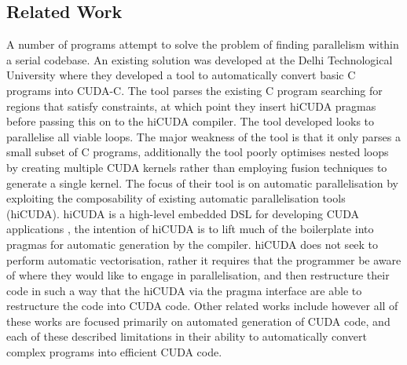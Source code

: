 \subsection{Related Work}
A number of programs attempt to solve the problem of finding parallelism within a serial codebase.
An existing solution was developed at the Delhi Technological University\cite{jindal2012automated}
where they developed a tool to automatically convert basic C programs into CUDA-C. The tool parses
the existing C program searching for regions that satisfy constraints, at which point they insert
hiCUDA pragmas before passing this on to the hiCUDA compiler. The tool developed looks to
parallelise all viable loops. The major weakness of the tool is that it only parses a small subset
of C programs, additionally the tool poorly optimises nested loops by creating multiple CUDA kernels
rather than employing fusion techniques to generate a single kernel. The focus of their tool is on
automatic parallelisation by exploiting the composability of existing automatic parallelisation
tools (hiCUDA). hiCUDA is a high-level embedded DSL for developing CUDA applications
\cite{han2011hicuda}, the intention of hiCUDA is to lift much of the boilerplate into pragmas for
automatic generation by the compiler. hiCUDA does not seek to perform automatic vectorisation,
rather it requires that the programmer be aware of where they would like to engage in
parallelisation, and then restructure their code in such a way that the hiCUDA via the pragma
interface are able to restructure the code into CUDA code. Other related works include
\cite{baskaran2010automatic}\cite{yan2009jcuda}\cite{verdoolaege2013polyhedral} however all of these
works are focused primarily on automated generation of CUDA code, and each of these described
limitations in their ability to automatically convert complex programs into efficient CUDA code.
 
